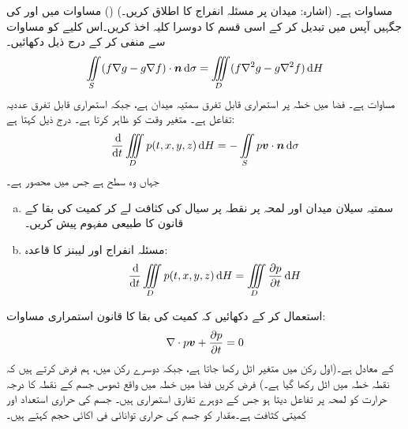مساوات  ہے۔ (اشارہ: میدان  پر مسئلہ انفراج کا اطلاق کریں۔)
\quad ()
مساوات  میں  اور   کی جگہیں آپس میں تبدیل کر کے اسی قسم کا دوسرا کلیہ  اخذ کریں۔اس کلیے  کو مساوات  سے منفی کر کے درج ذیل دکھائیں۔
\begin{align}\label{مساوات_سمتی_میدان_گرین_کلیہ_دوم}
\iint\limits_S (f\nabla g-g\nabla f)\cdot \an\dif\sigma=\iiint\limits_D (f\nabla^2g-g\nabla^2f)\dif H
\end{align}
مساوات  ہے۔ 
\quad
فضا میں خطہ  پر   استمراری قابل تفرق سمتیہ میدان ہے، جبکہ   استمراری قابل تفرق عددیہ تفاعل ہے۔ متغیر  وقت کو ظاہر کرتا ہے۔ درج ذیل کہتا ہے:
\[\frac{\dif}{\dif t}\iiint\limits_D p(t,x,y,z)\dif H=-\iint\limits_S p\kvec{v}\cdot\an\dif\sigma\]
جہاں  وہ سطح ہے جس میں   محصور ہے۔
\begin{enumerate}[a.]
\item
سمتیہ سیلان میدان   اور لمحہ   پر نقطہ  پر سیال کی کثافت  لے کر کمیت کی بقا کے قانون کا طبیعی مفہوم پیش کریں۔
\item
مسئلہ انفراج اور    لیبنز کا قاعدہ:
\[\frac{\dif}{\dif t}\iiint\limits_D p(t,x,y,z)\dif H=\iiint\limits_D \frac{\partial p}{\partial t}\dif H\]
\end{enumerate}
استعمال کر کے دکھائیں کہ کمیت کی بقا کا قانون استمراری مساوات:
\[\nabla \cdot p{{\boldsymbol{v}}}+\frac{\partial p}{\partial t}=0\]
کے معادل  ہے۔(اول رکن   میں  متغیر  اٹل رکھا جاتا ہے، جبکہ دوسرے رکن  میں، ہم فرض کرتے ہیں کہ نقطہ  خطہ   میں   اٹل رکھا گیا ہے۔)
\quad
فرض کریں فضا میں خطہ   میں واقع   ٹھوس جسم  کے نقطہ  کا درجہ حرارت کو  لمحہ  پر  تفاعل  دیتا ہو جس کے دوہرے تفارق  استمراری ہیں۔ جسم کی حراری استعداد  اور کمیتی  کثافت  ہے۔مقدار  کو  جسم کی  حراری توانائی فی اکائی حجم   کہتے ہیں۔
